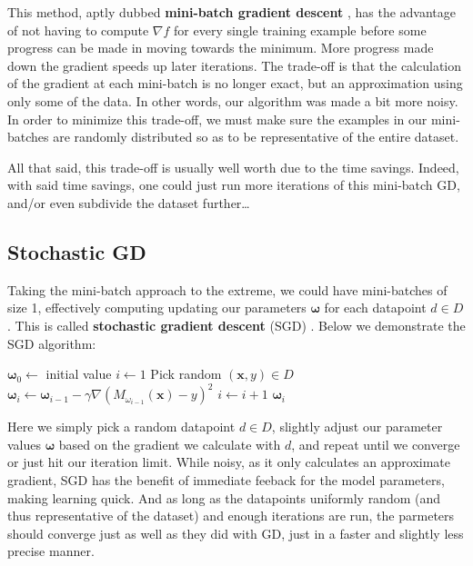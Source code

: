 \documentclass{article}
\renewcommand\vec{\mathbf}
\begin{document}
This method, aptly dubbed \textbf{mini-batch gradient descent} \cite{2019arXiv190303614Z}, has the advantage of not having to compute $\nabla f$ for every single training example before some progress can be made in moving towards the minimum. More progress made down the gradient speeds up later iterations. The trade-off is that the calculation of the gradient at each mini-batch is no longer exact, but an approximation using only some of the data. In other words, our algorithm was made a bit more noisy. In order to minimize this trade-off, we must make sure the examples in our mini-batches are randomly distributed so as to be representative of the entire dataset.

All that said, this trade-off is usually well worth due to the time savings. Indeed, with said time savings, one could just run more iterations of this mini-batch GD, and/or even subdivide the dataset further\dots

\subsection*{Stochastic GD}
Taking the mini-batch approach to the extreme, we could have mini-batches of size 1, effectively computing updating our parameters $\boldsymbol\omega$ for each datapoint $d\in D$. This is called \textbf{stochastic gradient descent} (SGD) \cite{2019arXiv190303614Z}. Below we demonstrate the SGD algorithm:
\vspace{5mm}

\begin{algorithmic}
  \State $\boldsymbol\omega_0\gets$ initial value
  \State $i\gets 1$
  \Repeat
    \State Pick random $(\vec x, y)\in D$
    \State $\boldsymbol\omega_i\gets\boldsymbol\omega_{i-1}-\gamma\nabla(M_{\omega_{i-1}}(\vec x)-y)^2$
    $i\gets i+1$
  \State \Return $\boldsymbol\omega_i$
\EndFunction
\end{algorithmic}
\vspace{5mm}

Here we simply pick a random datapoint $d\in D$, slightly adjust our parameter values $\boldsymbol\omega$ based on the gradient we calculate with $d$, and repeat until we converge or just hit our iteration limit. While noisy, as it only calculates an approximate gradient, SGD has the benefit of immediate feeback for the model parameters, making learning quick. And as long as the datapoints uniformly random (and thus representative of the dataset) and enough iterations are run, the parmeters should converge just as well as they did with GD, just in a faster and slightly less precise manner.
\end{document}
